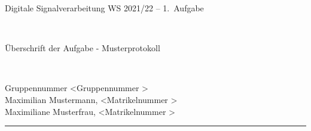 \documentclass[12pt,a4paper,austrian]{article}
\begin{document}
\pagestyle{plain}


\thispagestyle{empty}
\noindent
\begin{minipage}[b][4cm]{1.0\textwidth}  
\begin{center}
\begin{bf} 
\begin{large} Digitale Signalverarbeitung WS 2021/22 -- 1.~Aufgabe\end{large} \\
\vspace{0.3cm}
\begin{Large} Überschrift der Aufgabe - Musterprotokoll  \end{Large} \\
\vspace{0.3cm}
\end{bf}
\begin{large} 
Gruppennummer \textless Gruppennummer \textgreater\\
Maximilian Mustermann, \textless Matrikelnummer \textgreater\\
Maximiliane Musterfrau, \textless Matrikelnummer \textgreater\\
\end{large} 
\end{center}
\end{minipage}

\noindent \rule[0.8em]{\textwidth}{0.12mm}\\[-0.5em]
\end{document}
